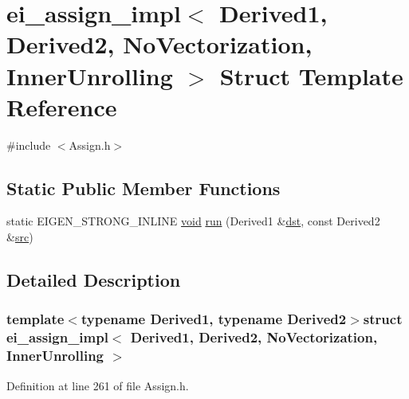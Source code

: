 \hypertarget{structei__assign__impl_3_01_derived1_00_01_derived2_00_01_no_vectorization_00_01_inner_unrolling_01_4}{\section{ei\-\_\-assign\-\_\-impl$<$ Derived1, Derived2, No\-Vectorization, Inner\-Unrolling $>$ Struct Template Reference}
\label{structei__assign__impl_3_01_derived1_00_01_derived2_00_01_no_vectorization_00_01_inner_unrolling_01_4}
}


{\ttfamily \#include $<$Assign.\-h$>$}

\subsection*{Static Public Member Functions}
\begin{DoxyCompactItemize}
\item 
static E\-I\-G\-E\-N\-\_\-\-S\-T\-R\-O\-N\-G\-\_\-\-I\-N\-L\-I\-N\-E \hyperlink{group___u_a_v_objects_plugin_ga444cf2ff3f0ecbe028adce838d373f5c}{void} \hyperlink{structei__assign__impl_3_01_derived1_00_01_derived2_00_01_no_vectorization_00_01_inner_unrolling_01_4_a0ad76472c8216b7844cdbb96672cdc11}{run} (Derived1 \&\hyperlink{glext_8h_a92034251bfd455d524a9b5610cddba00}{dst}, const Derived2 \&\hyperlink{glext_8h_a72e0fdf0f845ded60b1fada9e9195cd7}{src})
\end{DoxyCompactItemize}


\subsection{Detailed Description}
\subsubsection*{template$<$typename Derived1, typename Derived2$>$struct ei\-\_\-assign\-\_\-impl$<$ Derived1, Derived2, No\-Vectorization, Inner\-Unrolling $>$}



Definition at line 261 of file Assign.\-h.



